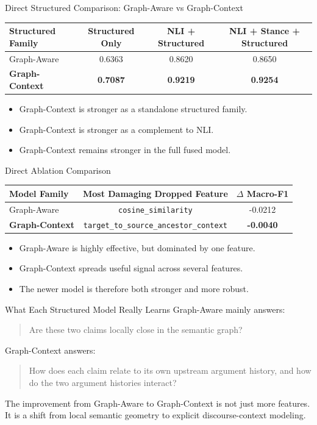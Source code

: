 \documentclass[aspectratio=169, 10pt]{beamer}
\newcommand{\takeawaybox}[2]{%
  \begin{tcolorbox}[colback=accentgreen!10, colframe=accentgreen,
    title={\textbf{Takeaway:} #1}, fonttitle=\bfseries\small,
    left=4pt, right=4pt, top=3pt, bottom=3pt, boxrule=1pt]
    \small #2
  \end{tcolorbox}}
\begin{document}
\begin{frame}{Direct Structured Comparison: Graph-Aware vs Graph-Context}
\begin{center}
\begin{tabular}{lccc}
\toprule
Structured Family & Structured Only & NLI + Structured & NLI + Stance + Structured \\
\midrule
Graph-Aware & 0.6363 & 0.8620 & 0.8650 \\
\textbf{Graph-Context} & \textbf{0.7087} & \textbf{0.9219} & \textbf{0.9254} \\
\bottomrule
\end{tabular}
\end{center}

\begin{itemize}
  \item Graph-Context is stronger as a standalone structured family.
  \item Graph-Context is stronger as a complement to NLI.
  \item Graph-Context remains stronger in the full fused model.
\end{itemize}
\end{frame}

\begin{frame}{Direct Ablation Comparison}
\begin{center}
\begin{tabular}{lcc}
\toprule
Model Family & Most Damaging Dropped Feature & \(\Delta\) Macro-F1 \\
\midrule
Graph-Aware & \texttt{cosine\_similarity} & -0.0212 \\
\textbf{Graph-Context} & \texttt{target\_to\_source\_ancestor\_context} & \textbf{-0.0040} \\
\bottomrule
\end{tabular}
\end{center}

\begin{itemize}
  \item Graph-Aware is highly effective, but dominated by one feature.
  \item Graph-Context spreads useful signal across several features.
  \item The newer model is therefore both stronger and more robust.
\end{itemize}
\end{frame}

\begin{frame}{What Each Structured Model Really Learns}
Graph-Aware mainly answers:
\begin{quote}
Are these two claims locally close in the semantic graph?
\end{quote}

Graph-Context answers:
\begin{quote}
How does each claim relate to its own upstream argument history, and how do the two argument histories interact?
\end{quote}

\takeawaybox{Final Comparison}{
The improvement from Graph-Aware to Graph-Context is not just more features. It is a shift from local semantic geometry to explicit discourse-context modeling.
}
\end{frame}
\end{document}

